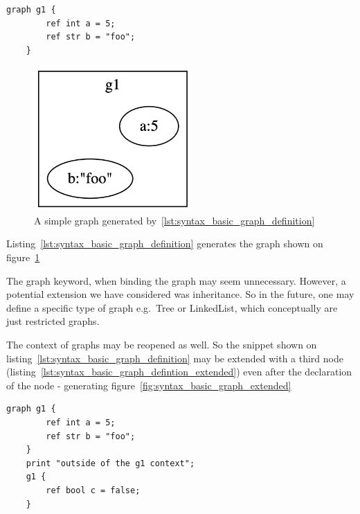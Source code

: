 \begin{lstlisting}[caption={Graph declaration.}, captionpos=b, label={lst:syntax_basic_graph_definition}]
    graph g1 {
        ref int a = 5;
        ref str b = "foo";
    }
\end{lstlisting}

\begin{figure}[H]
    \centering
    \includegraphics[width=6cm]{figures/syntax_section/syntax_simple_graph}
    \caption{A simple graph generated by~\ref{lst:syntax_basic_graph_definition}}
    \label{fig:syntax_basic_graph}
\end{figure}

Listing~\ref{lst:syntax_basic_graph_definition} generates the graph shown on figure~\ref{fig:syntax_basic_graph}

The graph keyword, when binding the graph may seem unnecessary.
However, a potential extension we have considered was inheritance.
So in the future, one may define a specific type of graph
e.g.\ Tree or LinkedList, which conceptually are just restricted graphs.

The context of graphs may be reopened as well.
So the snippet shown on listing~\ref{lst:syntax_basic_graph_definition}
may be extended with a third node (listing~\ref{lst:syntax_basic_graph_defintion_extended})
even after the declaration of the node - generating figure~\ref{fig:syntax_basic_graph_extended}

\begin{lstlisting}[caption={Extending a graph.},captionpos=b,label={lst:syntax_basic_graph_defintion_extended}]
    graph g1 {
        ref int a = 5;
        ref str b = "foo";
    }
    print "outside of the g1 context";
    g1 {
        ref bool c = false;
    }
\end{lstlisting}

